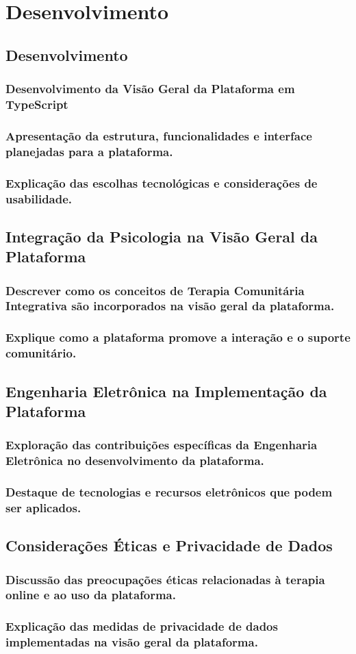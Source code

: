 \part{Desenvolvimento}
\chapter{Desenvolvimento}

\section{Desenvolvimento da Visão Geral da Plataforma em TypeScript}
\section{Apresentação da estrutura, funcionalidades e interface planejadas para a plataforma.}
\section{Explicação das escolhas tecnológicas e considerações de usabilidade.}

\chapter{Integração da Psicologia na Visão Geral da Plataforma}
\section{Descrever como os conceitos de Terapia Comunitária Integrativa são incorporados na visão geral da plataforma.}
\section{Explique como a plataforma promove a interação e o suporte comunitário.}

\chapter{Engenharia Eletrônica na Implementação da Plataforma}
\section{Exploração das contribuições específicas da Engenharia Eletrônica no desenvolvimento da plataforma.}
\section{Destaque de tecnologias e recursos eletrônicos que podem ser aplicados.}

\chapter{Considerações Éticas e Privacidade de Dados}
\section{Discussão das preocupações éticas relacionadas à terapia online e ao uso da plataforma.}
\section{Explicação das medidas de privacidade de dados implementadas na visão geral da plataforma.}

